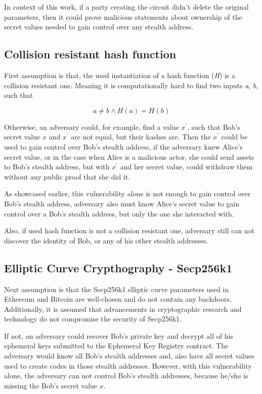 In context of this work, if a party creating the circuit didn't delete the
original parameters, then it could prove malicious statements about ownership
of the secret values needed to gain control over any stealth address.

\subsection{Collision resistant hash function}\label{crhf}

First assumption is that, the used instantiation of a hash function (\textit{H})
is a collision resistant one. Meaning it is computationally hard to find two
inputs \textit{a}, \textit{b}, such that

\[ a \neq b \land H(a) = H(b) \]

Otherwise, an adversary could, for example, find a value $x^\prime$,
such that Bob's secret value $x$ and $x^\prime$ are not equal, but their hashes
are. Then the $x^\prime$ could be used to gain control over Bob's stealth address,
if the adversary knew Alice's secret value, or in the case when Alice is a malicious
actor, she could send assets to Bob's stealth address, but with $x^\prime$ and
her secret value, could withdraw them without any public proof that she did it.

As showcased earlier, this vulnerability alone is not enough to gain control
over Bob's stealth address, adversary also must know Alice's secret value to
gain control over a Bob's stealth address, but only the one she interacted with.

Also, if used hash function is not a collision resistant one, adversary still can not
discover the identity of Bob, or any of his other stealth addresses.

\subsection{Elliptic Curve Crypthography - Secp256k1}

Next assumption is that the Secp256k1 elliptic curve parameters used in Ethereum
and Bitcoin\cite{bitcoinSecp256k1Bitcoin} are well-chosen and do not contain any backdoors. Additionally, it is
assumed that advancements in cryptographic research and technology do not
compromise the security of Secp256k1.

If not, an adversary could recover Bob's private key and decrypt all of his
ephemeral keys submitted to the Ephemeral Key Registry contract. The
adversary would know all Bob's stealth addresses and, also have all secret
values used to create codes in those stealth addresses. However, with this
vulnerability alone, the adversary can not control Bob's stealth addresses,
because he/she is missing the Bob's secret value $x$.

